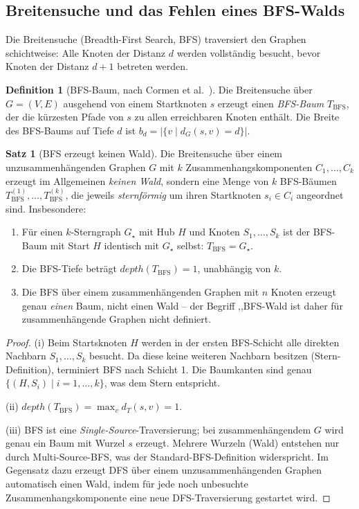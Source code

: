 ﻿\documentclass[a4paper,12pt]{report}
\theoremstyle{definition}
\newtheorem{definition}{Definition}[chapter]
\newtheorem{theorem}{Satz}[chapter]
\theoremstyle{remark}
\newcommand{\depth}{\mathit{depth}}
\begin{document}
\subsection{Breitensuche und das Fehlen eines BFS-Walds}

Die Breitensuche (Breadth-First Search, BFS) traversiert den Graphen
schichtweise: Alle Knoten der Distanz $d$ werden vollständig besucht, bevor
Knoten der Distanz $d+1$ betreten werden.

\begin{definition}[BFS-Baum, nach Cormen et al.~\cite{Cormen2009}]
\label{def:bfsbaum}
Die Breitensuche über $G = (V, E)$ ausgehend von einem Startknoten $s$
erzeugt einen \emph{BFS-Baum} $T_{\mathrm{BFS}}$, der die kürzesten Pfade
von $s$ zu allen erreichbaren Knoten enthält. Die Breite des BFS-Baums auf
Tiefe $d$ ist $b_d = |\{v \mid d_G(s,v) = d\}|$.
\end{definition}

\begin{theorem}[BFS erzeugt keinen Wald]
\label{thm:bfskeinwald}
Die Breitensuche über einem unzusammenhängenden Graphen $G$ mit $k$
Zusammenhangskomponenten $C_1, \ldots, C_k$ erzeugt im Allgemeinen
\emph{keinen Wald}, sondern eine Menge von $k$ BFS-Bäumen
$T_{\mathrm{BFS}}^{(1)}, \ldots, T_{\mathrm{BFS}}^{(k)}$, die jeweils
\emph{sternförmig} um ihren Startknoten $s_i \in C_i$ angeordnet sind.
Insbesondere:
\begin{enumerate}[label=(\roman*)]
  \item Für einen $k$-Stern\-graph $G_\star$ mit Hub $H$ und Knoten
        $S_1, \ldots, S_k$ ist der BFS-Baum mit Start $H$ identisch
        mit $G_\star$ selbst: $T_{\mathrm{BFS}} = G_\star$.
  \item Die BFS-Tiefe beträgt $\depth(T_{\mathrm{BFS}}) = 1$, unabhängig
        von $k$.
  \item Die BFS über einem zusammenhängenden Graphen mit $n$ Knoten
        erzeugt genau \emph{einen} Baum, nicht einen Wald -- der Begriff
        ,,BFS-Wald\grqq{} ist daher für zusammenhängende Graphen
        nicht definiert.
\end{enumerate}
\end{theorem}

\begin{proof}
(i) Beim Startsknoten $H$ werden in der ersten BFS-Schicht alle direkten
Nachbarn $S_1, \ldots, S_k$ besucht. Da diese keine weiteren Nachbarn
besitzen (Stern-Definition), terminiert BFS nach Schicht 1.
Die Baumkanten sind genau $\{(H, S_i) \mid i = 1, \ldots, k\}$, was dem
Stern entspricht.

(ii) $\depth(T_{\mathrm{BFS}}) = \max_{v} d_{T}(s, v) = 1$.

(iii) BFS ist eine \emph{Single-Source}-Traversierung; bei zusammenhängendem
$G$ wird genau ein Baum mit Wurzel $s$ erzeugt. Mehrere Wurzeln (Wald)
entstehen nur durch Multi-Source-BFS, was der Standard-BFS-Definition
widerspricht. Im Gegensatz dazu erzeugt DFS über einem unzusammenhängenden
Graphen automatisch einen Wald, indem für jede noch unbesuchte Zusammenhangskomponente
eine neue DFS-Traversierung gestartet wird.
\end{proof}
\end{document}
